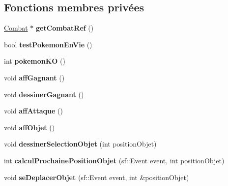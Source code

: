\subsection*{Fonctions membres privées}
\begin{DoxyCompactItemize}
\item 
\mbox{\label{class_aff_s_f_m_l_a9783ceab87cd8b519bb977a8e3c16bc0}} 
\hyperlink{class_combat}{Combat} $\ast$ {\bfseries get\+Combat\+Ref} ()
\item 
\mbox{\label{class_aff_s_f_m_l_a3c762ad417129d4b6af834f64efd521f}} 
bool {\bfseries test\+Pokemon\+En\+Vie} ()
\item 
\mbox{\label{class_aff_s_f_m_l_a67f491f3a75f8a63a9ede34699d6d34f}} 
int {\bfseries pokemon\+KO} ()
\item 
\mbox{\label{class_aff_s_f_m_l_a3b0ad6d26bb20c8730218c2ace4760d0}} 
void {\bfseries aff\+Gagnant} ()
\item 
\mbox{\label{class_aff_s_f_m_l_a6704c17d6e24e07091d5fc1361cd390b}} 
void {\bfseries dessiner\+Gagnant} ()
\item 
\mbox{\label{class_aff_s_f_m_l_aa837b25269d2dd73026d6124c9cb7ccc}} 
void {\bfseries aff\+Attaque} ()
\item 
\mbox{\label{class_aff_s_f_m_l_a95c2240dbb1722cf81dcf9e03ea38698}} 
void {\bfseries aff\+Objet} ()
\item 
\mbox{\label{class_aff_s_f_m_l_a03688f6993a9055c683a147e1b9ebab6}} 
void {\bfseries dessiner\+Selection\+Objet} (int position\+Objet)
\item 
\mbox{\label{class_aff_s_f_m_l_acd995939e445ce3e0ab4ab1d499ec590}} 
int {\bfseries calcul\+Prochaine\+Position\+Objet} (sf\+::\+Event event, int position\+Objet)
\item 
\mbox{\label{class_aff_s_f_m_l_a4d9b64360fd073023209fca46b364666}} 
void {\bfseries se\+Deplacer\+Objet} (sf\+::\+Event event, int \&position\+Objet)
\item 

\end{DoxyCompactItemize}
